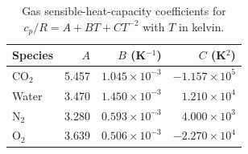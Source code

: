 \begin{table}[pos=htbp]
\centering\small
\caption{Gas sensible-heat-capacity coefficients for $c_p/R=A+BT+CT^{-2}$ with $T$ in kelvin.}
\label{tab:gas-cp-coefficients}
\begin{tabular}{@{}lrrr@{}}
\toprule
Species & $A$ & $B$ (K$^{-1}$) & $C$ (K$^2$)\\
\midrule
CO$_2$ & 5.457 & $1.045\times10^{-3}$ & $-1.157\times10^5$\\
Water & 3.470 & $1.450\times10^{-3}$ & $1.210\times10^4$\\
N$_2$ & 3.280 & $0.593\times10^{-3}$ & $4.000\times10^3$\\
O$_2$ & 3.639 & $0.506\times10^{-3}$ & $-2.270\times10^4$\\
\bottomrule
\end{tabular}
\end{table}

